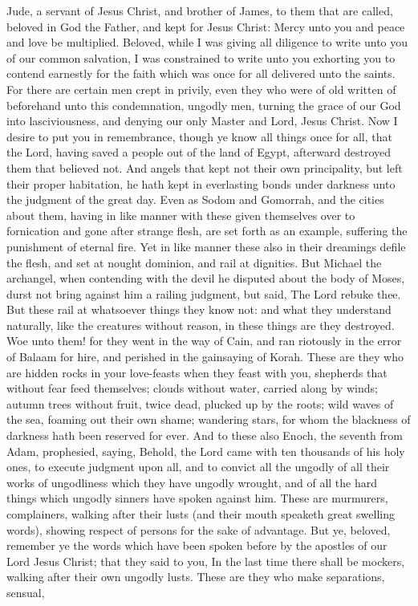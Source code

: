 


Jude, a servant of Jesus Christ, and brother of James, to them that are called, beloved in God the Father, and kept for Jesus Christ: Mercy unto you and peace and love be multiplied.  Beloved, while I was giving all diligence to write unto you of our common salvation, I was constrained to write unto you exhorting you to contend earnestly for the faith which was once for all delivered unto the saints. For there are certain men crept in privily, even they who were of old written of beforehand unto this condemnation, ungodly men, turning the grace of our God into lasciviousness, and denying our only Master and Lord, Jesus Christ.  Now I desire to put you in remembrance, though ye know all things once for all, that the Lord, having saved a people out of the land of Egypt, afterward destroyed them that believed not. And angels that kept not their own principality, but left their proper habitation, he hath kept in everlasting bonds under darkness unto the judgment of the great day. Even as Sodom and Gomorrah, and the cities about them, having in like manner with these given themselves over to fornication and gone after strange flesh, are set forth as an example, suffering the punishment of eternal fire. Yet in like manner these also in their dreamings defile the flesh, and set at nought dominion, and rail at dignities. But Michael the archangel, when contending with the devil he disputed about the body of Moses, durst not bring against him a railing judgment, but said, The Lord rebuke thee. But these rail at whatsoever things they know not: and what they understand naturally, like the creatures without reason, in these things are they destroyed. Woe unto them! for they went in the way of Cain, and ran riotously in the error of Balaam for hire, and perished in the gainsaying of Korah. These are they who are hidden rocks in your love-feasts when they feast with you, shepherds that without fear feed themselves; clouds without water, carried along by winds; autumn trees without fruit, twice dead, plucked up by the roots; wild waves of the sea, foaming out their own shame; wandering stars, for whom the blackness of darkness hath been reserved for ever. And to these also Enoch, the seventh from Adam, prophesied, saying, Behold, the Lord came with ten thousands of his holy ones, to execute judgment upon all, and to convict all the ungodly of all their works of ungodliness which they have ungodly wrought, and of all the hard things which ungodly sinners have spoken against him. These are murmurers, complainers, walking after their lusts (and their mouth speaketh great swelling words), showing respect of persons for the sake of advantage.  But ye, beloved, remember ye the words which have been spoken before by the apostles of our Lord Jesus Christ; that they said to you, In the last time there shall be mockers, walking after their own ungodly lusts. These are they who make separations, sensual, 